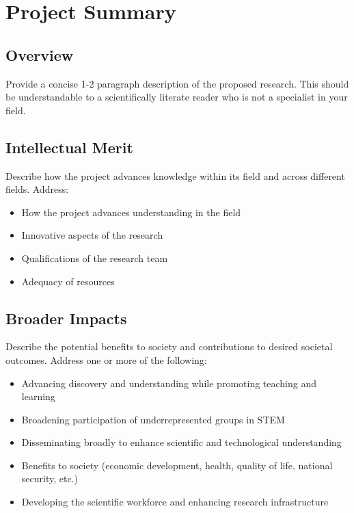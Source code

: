 \documentclass[11pt,letterpaper]{article}
\begin{document}

\section*{Project Summary}

\subsection*{Overview}
Provide a concise 1-2 paragraph description of the proposed research. This should be understandable to a scientifically literate reader who is not a specialist in your field.

\subsection*{Intellectual Merit}
Describe how the project advances knowledge within its field and across different fields. Address:
\begin{itemize}
    \item How the project advances understanding in the field
    \item Innovative aspects of the research
    \item Qualifications of the research team
    \item Adequacy of resources
\end{itemize}

\subsection*{Broader Impacts}
Describe the potential benefits to society and contributions to desired societal outcomes. Address one or more of the following:
\begin{itemize}
    \item Advancing discovery and understanding while promoting teaching and learning
    \item Broadening participation of underrepresented groups in STEM
    \item Disseminating broadly to enhance scientific and technological understanding
    \item Benefits to society (economic development, health, quality of life, national security, etc.)
    \item Developing the scientific workforce and enhancing research infrastructure
\end{itemize}
\end{document}
